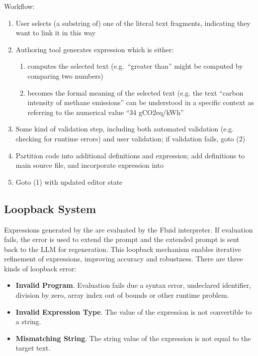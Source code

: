 Workflow:
\begin{enumerate}
\item User selects (a substring of) one of the literal text fragments, indicating they want to link it in this
way
\item Authoring tool generates expression which is either:
  \begin{enumerate}
  \item computes the selected text (e.g.~``greater than'' might be computed by comparing two numbers)
  \item becomes the formal meaning of the selected text (e.g. the text ``carbon intensity of methane
emissions'' can be understood in a specific context as referring to the numerical value ``34 gCO2eq/kWh''
  \end{enumerate}
\item Some kind of validation step, including both automated validation (e.g. checking for runtime errors) and
user validation; if validation fails, goto (2)
\item Partition code into additional definitions and expression; add definitions to main source file, and
incorporate expression into 
\item Goto (1) with updated editor state
\end{enumerate}

\subsection{Loopback System}
\label{subsec:loopback-system}

Expressions generated by the \InterpretationAgent are evaluated by the Fluid interpreter. If evaluation fails,
the error is used to extend the prompt and the extended prompt is sent back to the LLM for regeneration. This
loopback mechanism enables iterative refinement of expressions, improving accuracy and robustness. There are
three kinds of loopback error:

\begin{itemize}
    \item \textbf{Invalid Program}. Evaluation fails due a syntax error, undeclared identifier, division by
    zero, array index out of bounds or other runtime problem.
    \item \textbf{Invalid Expression Type}. The value of the expression is not convertible to a string.
    \item \textbf{Mismatching String}. The string value of the expression is not equal to the target text.
\end{itemize}

